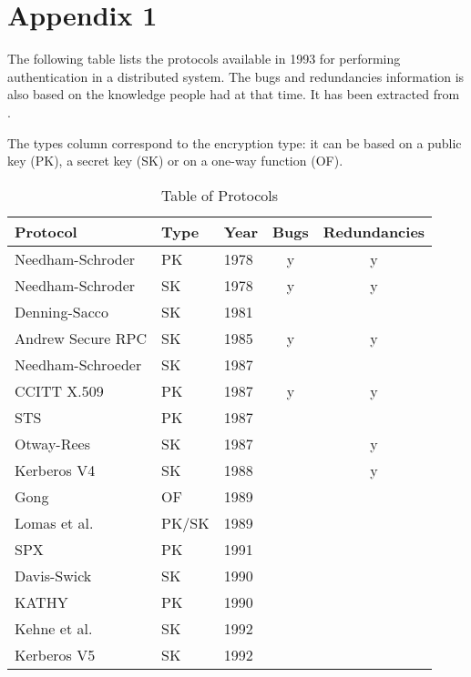 \chapter{Appendix 1}
\label{appendix:protocol_list}

The following table lists the protocols available in 1993 for performing authentication in a distributed system. The bugs and redundancies information is also based on the knowledge people had at that time. It has been extracted from \cite{Liebl1993}.

The types column correspond to the encryption type: it can be based on a public key (PK), a secret key (SK) or on a one-way function (OF).
	\begin{table}[!ht]
		\centering
		\caption{Table of Protocols}
		\begin{tabular}{| l | l | l | c | c |}
			\hline
			Protocol & Type & Year & Bugs & Redundancies \\
			\hline
			Needham-Schroder & PK & 1978 & y & y \\
			\hline
			Needham-Schroder & SK & 1978 & y & y \\
			\hline
			Denning-Sacco & SK & 1981 &  &  \\
			\hline
			Andrew Secure RPC & SK & 1985 & y & y \\
			\hline
			Needham-Schroeder & SK & 1987 &  &  \\
			\hline
			CCITT X.509 & PK & 1987 & y & y \\
			\hline
			STS & PK & 1987 &  &  \\
			\hline
			Otway-Rees & SK & 1987 &  & y \\
			\hline
			Kerberos V4 & SK & 1988 &  & y \\
			\hline
			Gong & OF & 1989 &  &  \\
			\hline
			Lomas et al. & PK/SK & 1989 &  &  \\
			\hline
			SPX & PK & 1991 &  &  \\
			\hline
			Davis-Swick & SK & 1990 &  &  \\
			\hline
			KATHY & PK & 1990 &  &  \\
			\hline
			Kehne et al. & SK & 1992 &  &  \\
			\hline
			Kerberos V5 & SK & 1992 &  &  \\
			\hline
		\end{tabular}
	\end{table}
